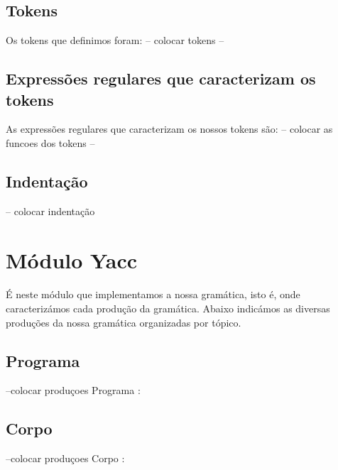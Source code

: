 \documentclass[11pt,a4paper]{report}
\begin{document}
    \subsection{Tokens}
       Os tokens que definimos foram:
          -- colocar tokens --
      
    \paragraph{}
    \subsection{Expressões regulares que caracterizam os tokens}
    As expressões regulares que caracterizam os nossos tokens são:
     -- colocar as funcoes dos tokens --

    \paragraph{}
    \subsection{Indentação}
    -- colocar indentação

    
    \section{Módulo Yacc}
    \paragraph{}
    É neste módulo que implementamos a nossa gramática, isto é, onde caracterizámos cada produção da gramática.
    Abaixo indicámos as diversas produções da nossa gramática organizadas por tópico.
    
    \paragraph{}
    \subsection{Programa}
       --colocar produçoes Programa : 
      
    \paragraph{}
    \subsection{Corpo}
       --colocar produçoes Corpo :
\end{document}
